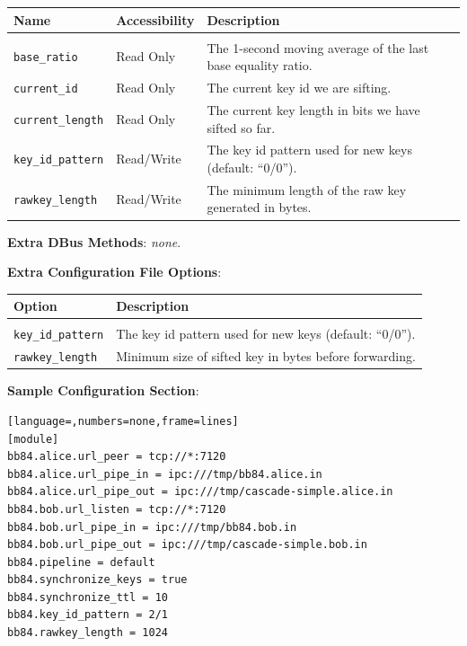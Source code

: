 \begin{tabular}{llp{7cm}}

Name                        & Accessibility &   Description \\
\hline
\\
\texttt{base\_ratio}        & Read Only     &   The 1-second moving average of the last base equality ratio. \\ [0.5em]
\texttt{current\_id}        & Read Only     &   The current key id we are sifting. \\ [0.5em]
\texttt{current\_length}    & Read Only     &   The current key length in bits we have sifted so far. \\ [0.5em]
\texttt{key\_id\_pattern}   & Read/Write    &   The key id pattern used for new keys (default: ``0/0''). \\ [0.5em]
\texttt{rawkey\_length}     & Read/Write    &   The minimum length of the raw key generated in bytes. \\ [0.5em]

\end{tabular}

\bigskip

\noindent \textbf{Extra DBus Methods}: \emph{none}.

\bigskip

\noindent \textbf{Extra Configuration File Options}:

\medskip

\begin{tabular}{lp{9cm}}

Option                      & Description \\
\hline
\\
\texttt{key\_id\_pattern}   & The key id pattern used for new keys (default: ``0/0''). \\ [0.5em]
\texttt{rawkey\_length}     & Minimum size of sifted key in bytes before forwarding. \\ [0.5em]

\end{tabular}

\bigskip

\clearpage

\noindent \textbf{Sample Configuration Section}: 

\medskip

\begin{lstlisting}[language=,numbers=none,frame=lines]
[module]
bb84.alice.url_peer = tcp://*:7120
bb84.alice.url_pipe_in = ipc:///tmp/bb84.alice.in
bb84.alice.url_pipe_out = ipc:///tmp/cascade-simple.alice.in
bb84.bob.url_listen = tcp://*:7120
bb84.bob.url_pipe_in = ipc:///tmp/bb84.bob.in
bb84.bob.url_pipe_out = ipc:///tmp/cascade-simple.bob.in
bb84.pipeline = default
bb84.synchronize_keys = true
bb84.synchronize_ttl = 10
bb84.key_id_pattern = 2/1
bb84.rawkey_length = 1024
\end{lstlisting}

